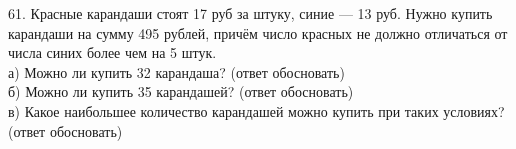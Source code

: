 61. Красные карандаши стоят 17 руб за штуку, синие --- 13 руб. Нужно купить карандаши на сумму 495 рублей, причём число красных не должно отличаться от числа синих более чем на 5 штук.\\
а) Можно ли купить 32 карандаша? (ответ обосновать)\\
б) Можно ли купить 35 карандашей? (ответ обосновать)\\
в) Какое наибольшее количество карандашей можно купить при таких условиях? (ответ обосновать)\\
